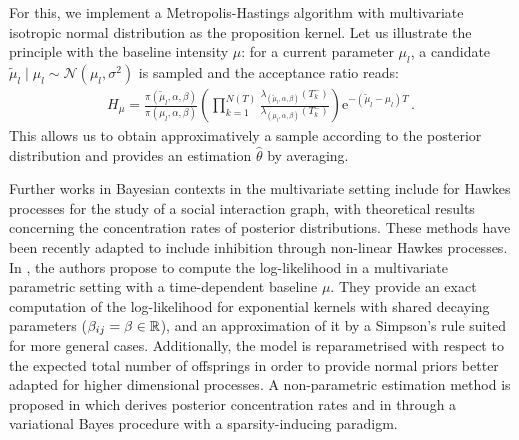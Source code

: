 For this, we implement a Metropolis-Hastings algorithm with multivariate isotropic normal distribution as the proposition kernel.
Let us illustrate the principle with the baseline intensity $\mu$: for a current parameter $\mu_l$, a candidate $\tilde \mu_l\mid \mu_l\sim\mathcal{N}(\mu_l, \sigma^2)$ is sampled and the acceptance ratio reads:
\begin{align*}
    H_\mu = \frac{\pi(\tilde\mu_l, \alpha, \beta)}{\pi(\mu_l, \alpha, \beta)}\left(\prod_{k=1}^{N(T)}\frac{\lambda_{(\tilde \mu_l,\alpha, \beta)}(T_k^-)}{\lambda_{(\mu_l, \alpha, \beta)}(T_k^-)}\right)\mathrm{e}^{-(\tilde\mu_l - \mu_l) T}\,.
\end{align*}
This allows us to obtain approximatively a sample according to the posterior distribution and provides an estimation $\hat \theta$ by averaging.

Further works in Bayesian contexts in the multivariate setting include \textcite{Blundell2012} for Hawkes processes for the study of a social interaction graph, \textcite{Donnet2020} with theoretical results concerning the concentration rates of posterior distributions. These methods have been recently adapted to include inhibition through non-linear Hawkes processes.
In \textcite{Deutsch2022}, the authors propose to compute the log-likelihood in a multivariate parametric setting with a time-dependent baseline $\mu$. %
They provide an exact computation of the log-likelihood for exponential kernels with shared decaying parameters ($\beta_{ij} = \beta \in{\mathbb R}$), and an approximation of it by a Simpson's rule suited for more general cases. Additionally, the model is reparametrised with respect to the expected total number of offsprings in order to provide normal priors better adapted for higher dimensional processes.  
A non-parametric estimation method is proposed in \textcite{Sulem2024} which derives posterior concentration rates and in \textcite{Sulem2023} through a variational Bayes procedure with a sparsity-inducing paradigm. 



